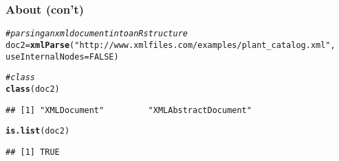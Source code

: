 \documentclass[12pt]{beamer}\usepackage[]{graphicx}\usepackage[]{color}
\makeatletter
\newcommand{\hlnum}[1]{\textcolor[rgb]{0.686,0.059,0.569}{#1}}%
\newcommand{\hlstr}[1]{\textcolor[rgb]{0.192,0.494,0.8}{#1}}%
\newcommand{\hlcom}[1]{\textcolor[rgb]{0.678,0.584,0.686}{\textit{#1}}}%
\newcommand{\hlstd}[1]{\textcolor[rgb]{0.345,0.345,0.345}{#1}}%
\newcommand{\hlkwb}[1]{\textcolor[rgb]{0.69,0.353,0.396}{#1}}%
\newcommand{\hlkwc}[1]{\textcolor[rgb]{0.333,0.667,0.333}{#1}}%
\newcommand{\hlkwd}[1]{\textcolor[rgb]{0.737,0.353,0.396}{\textbf{#1}}}%
\newenvironment{kframe}{%
 \def\at@end@of@kframe{}%
 \ifinner\ifhmode%
  \def\at@end@of@kframe{\end{minipage}}%
  \begin{minipage}{\columnwidth}%
 \fi\fi%
 \def\FrameCommand##1{\hskip\@totalleftmargin \hskip-\fboxsep
 \colorbox{shadecolor}{##1}\hskip-\fboxsep
     \hskip-\linewidth \hskip-\@totalleftmargin \hskip\columnwidth}%
 \MakeFramed {\advance\hsize-\width
   \@totalleftmargin\z@ \linewidth\hsize
   \@setminipage}}%
 {\par\unskip\endMakeFramed%
 \at@end@of@kframe}
\newenvironment{knitrout}{}{} %
\makeatother
\begin{document}

\begin{frame}[fragile]
\frametitle{About  (con't)}
\begin{knitrout}\scriptsize
{}\color{fgcolor}\begin{kframe}
\begin{alltt}
\hlcom{# parsing an xml document into an R structure}
\hlstd{doc2} \hlkwb{=} \hlkwd{xmlParse}\hlstd{(}\hlstr{"http://www.xmlfiles.com/examples/plant_catalog.xml"}\hlstd{,}
                \hlkwc{useInternalNodes} \hlstd{=} \hlnum{FALSE}\hlstd{)}
\end{alltt}
\end{kframe}
\end{knitrout}

\begin{knitrout}\footnotesize
{}\color{fgcolor}\begin{kframe}
\begin{alltt}
\hlcom{# class }
\hlkwd{class}\hlstd{(doc2)}
\end{alltt}
\begin{verbatim}
## [1] "XMLDocument"         "XMLAbstractDocument"
\end{verbatim}
\begin{alltt}
\hlkwd{is.list}\hlstd{(doc2)}
\end{alltt}
\begin{verbatim}
## [1] TRUE
\end{verbatim}
\end{kframe}
\end{knitrout}

\end{frame}

\end{document}
